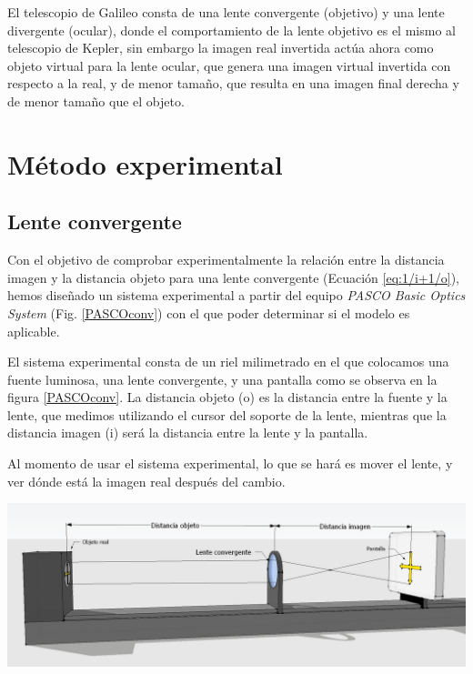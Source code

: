 \documentclass[a4paper,12pt]{article}
\newenvironment{Figure}
  {\par\medskip\noindent\minipage{\linewidth}}
  {\endminipage\par\medskip}
\begin{document}
\begin{multicols*}{2}
        El telescopio de Galileo consta de una lente convergente (objetivo) y una lente divergente (ocular), donde el comportamiento de la lente objetivo es el mismo al telescopio de Kepler, sin embargo la imagen real invertida actúa ahora como objeto virtual para la lente ocular, que genera una imagen virtual invertida con respecto a la real, y de menor tamaño, que resulta en una imagen final derecha y de menor tamaño que el objeto.

\section*{Método experimental}

    \subsection*{Lente convergente}

        Con el objetivo de comprobar experimentalmente la relación entre la distancia imagen y la distancia objeto para una lente convergente (Ecuación \ref{eq:1/i+1/o}), hemos diseñado un sistema experimental a partir del equipo \emph{PASCO Basic Optics System} (Fig. \ref{PASCOconv}) con el que poder determinar si el modelo es aplicable.

        El sistema experimental consta de un riel milimetrado en el que colocamos una fuente luminosa, una lente convergente, y una pantalla como se observa en la figura \ref{PASCOconv}. La distancia objeto (o) es la distancia entre la fuente y la lente, que medimos utilizando el cursor del soporte de la lente, mientras que la distancia imagen (i) será la distancia entre la lente y la pantalla.

        Al momento de usar el sistema experimental, lo que se hará es mover el lente, y ver dónde está la imagen real después del cambio.

        \begin{Figure}
            \centering
            \includegraphics[width=1\linewidth]{LenteConvergente.jpg}
            \label{PASCOconv}
        \end{Figure}


\end{multicols*}
\end{document}
